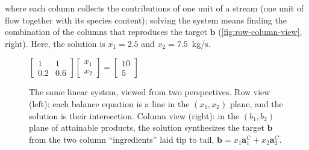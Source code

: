 where each column collects the contributions of one unit of a stream (one unit of flow together with its species content); solving the system means finding the combination of the columns that reproduces the target $\mathbf{b}$ (\autoref{fig:row-column-view}, right).
Here, the solution is $x_1 = 2.5$ and $x_2 = 7.5$~kg/s.

\begin{figure}[H]
    \centering
    $\begin{bmatrix} 1 & 1 \\ 0.2 & 0.6 \end{bmatrix} \begin{bmatrix} x_1 \\ x_2 \end{bmatrix} = \begin{bmatrix} 10 \\ 5 \end{bmatrix}$\\[0.8em]
    \hspace{0.8cm}
    \caption{The same linear system, viewed from two perspectives. Row view (left): each balance equation is a line in the $(x_1, x_2)$ plane, and the solution is their intersection. Column view (right): in the $(b_1, b_2)$ plane of attainable products, the solution synthesizes the target $\mathbf{b}$ from the two column ``ingredients'' laid tip to tail, $\mathbf{b} = x_1 \mathbf{a}^C_1 + x_2 \mathbf{a}^C_2$.}
    \label{fig:row-column-view}
\end{figure}

